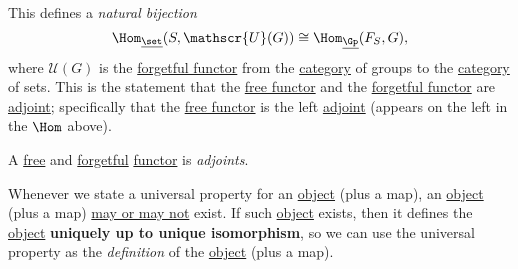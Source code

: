 \begin{note}
	This defines a \emph{natural bijection}
	\[
		\Hom_{\underline{\set}}(S, \mathscr{U}(G))\cong \Hom_{\underline{\Gp}}(F_S, G),
	\]
	where \(\mathscr{U} (G)\) is the \hyperref[eg:forgetful-functor]{forgetful functor} from the \hyperref[def:category]{category} of groups to the \hyperref[def:category]{category} of sets. This is the statement that the \hyperref[eg:free-functor]{free functor} and the \hyperref[eg:forgetful-functor]{forgetful functor} are \hyperref[def:adjoint-functor]{adjoint}; specifically that the \hyperref[eg:free-functor]{free functor} is the left \hyperref[def:adjoint-functor]{adjoint} (appears on the left in the \(\Hom\) above).
\end{note}

\begin{definition}\label{def:adjoint-functor}
	A \hyperref[eg:free-functor]{free} and \hyperref[eg:forgetful-functor]{forgetful} \hyperref[def:functor]{functor} is \emph{adjoints}.
\end{definition}

\begin{remark}
	Whenever we state a universal property for an \hyperref[def:object]{object} (plus a map), an \hyperref[def:object]{object} (plus a map) \underline{may or may not} exist. If such \hyperref[def:object]{object} exists, then it defines the \hyperref[def:object]{object} \textbf{uniquely up to unique isomorphism}, so we can use the universal property as the \emph{definition} of the \hyperref[def:object]{object} (plus a map).
\end{remark}


